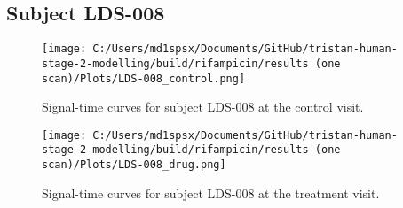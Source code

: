 \documentclass{epflreport}%
\begin{document}
\subsection{Subject LDS{-}008}%
\label{subsec:SubjectLDS{-}008}%

%


\begin{figure}[h!]%
\centering%
\texttt{[image: C:/Users/md1spsx/Documents/GitHub/tristan-human-stage-2-modelling/build/rifampicin/results (one scan)/Plots/LDS-008\_control.png]}%
\caption{Signal{-}time curves for subject LDS{-}008 at the control visit.}%
\end{figure}

%


\begin{figure}[h!]%
\centering%
\texttt{[image: C:/Users/md1spsx/Documents/GitHub/tristan-human-stage-2-modelling/build/rifampicin/results (one scan)/Plots/LDS-008\_drug.png]}%
\caption{Signal{-}time curves for subject LDS{-}008 at the treatment visit.}%
\end{figure}
\end{document}
